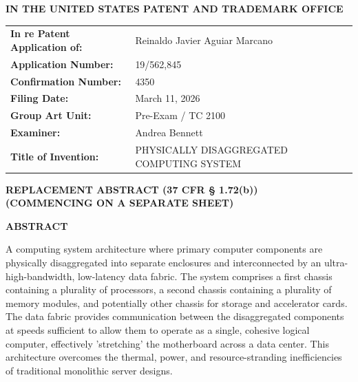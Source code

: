 \documentclass[11pt,letterpaper]{article}
\begin{document}
\thispagestyle{empty}

\begin{center}
    \large\textbf{IN THE UNITED STATES PATENT AND TRADEMARK OFFICE} \\
\end{center}

\vspace{0.2cm}
\noindent\begin{tabular}{p{2.3in}p{4.0in}}
\textbf{In re Patent Application of:} & Reinaldo Javier Aguiar Marcano \\
\textbf{Application Number:} & 19/562,845 \\
\textbf{Confirmation Number:} & 4350 \\
\textbf{Filing Date:} & March 11, 2026 \\
\textbf{Group Art Unit:} & Pre-Exam / TC 2100 \\
\textbf{Examiner:} & Andrea Bennett \\
\textbf{Title of Invention:} & PHYSICALLY DISAGGREGATED COMPUTING SYSTEM \\
\end{tabular}

\vspace{0.6cm}
\begin{center}
    \textbf{\large REPLACEMENT ABSTRACT (37 CFR \S{} 1.72(b))} \\
    \textbf{(COMMENCING ON A SEPARATE SHEET)}
\end{center}

\vspace{0.4cm}

\begin{center}
    \textbf{ABSTRACT}
\end{center}

A computing system architecture where primary computer components are physically disaggregated into separate enclosures and interconnected by an ultra-high-bandwidth, low-latency data fabric. The system comprises a first chassis containing a plurality of processors, a second chassis containing a plurality of memory modules, and potentially other chassis for storage and accelerator cards. The data fabric provides communication between the disaggregated components at speeds sufficient to allow them to operate as a single, cohesive logical computer, effectively 'stretching' the motherboard across a data center. This architecture overcomes the thermal, power, and resource-stranding inefficiencies of traditional monolithic server designs.
\end{document}
